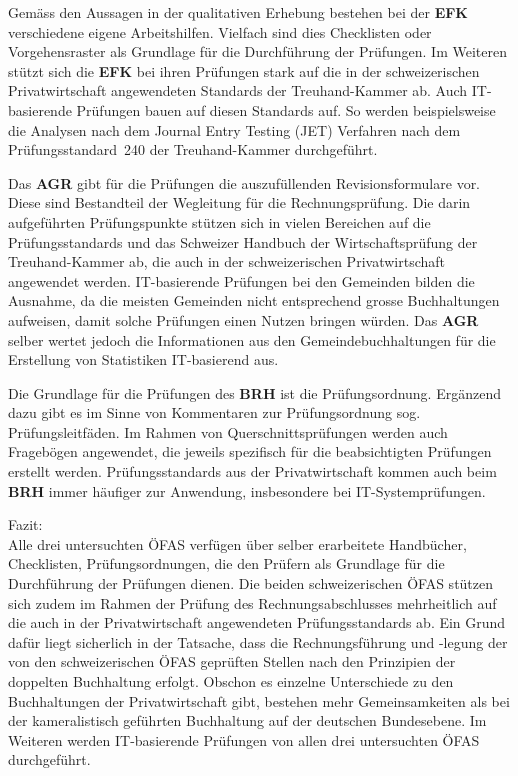 \documentclass[10pt]{article}
\begin{document}
Gemäss den Aussagen in der qualitativen Erhebung bestehen bei der \textbf{EFK} verschiedene eigene Arbeitshilfen. Vielfach sind dies Checklisten oder Vorgehensraster als Grundlage für die Durchführung der Prüfungen. Im Weiteren stützt sich die \textbf{EFK} bei ihren Prüfungen stark auf die in der schweizerischen Privatwirtschaft angewendeten Standards der Treuhand-Kammer ab. Auch IT-basierende Prüfungen bauen auf diesen Standards auf. So werden beispielsweise die Analysen nach dem Journal Entry Testing (JET) Verfahren nach dem Prüfungsstandard~240 der Treuhand-Kammer durchgeführt.

Das \textbf{AGR} gibt für die Prüfungen die auszufüllenden Revisionsformulare vor. Diese sind Bestandteil der Wegleitung für die Rechnungsprüfung. Die darin aufgeführten Prüfungspunkte stützen sich in vielen Bereichen auf die Prüfungsstandards und das Schweizer Handbuch der Wirtschaftsprüfung der Treuhand-Kammer ab, die auch in der schweizerischen Privatwirtschaft angewendet werden. IT-basierende Prüfungen bei den Gemeinden bilden die Ausnahme, da die meisten Gemeinden nicht entsprechend grosse Buchhaltungen aufweisen, damit solche Prüfungen einen Nutzen bringen würden. Das \textbf{AGR} selber wertet jedoch die Informationen aus den Gemeindebuchhaltungen für die Erstellung von Statistiken IT-basierend aus.

Die Grundlage für die Prüfungen des \textbf{BRH} ist die Prüfungsordnung. Ergänzend dazu gibt es im Sinne von Kommentaren zur Prüfungsordnung sog. Prüfungsleitfäden. Im Rahmen von Querschnittsprüfungen werden auch Fragebögen angewendet, die jeweils spezifisch für die beabsichtigten Prüfungen erstellt werden. Prüfungsstandards aus der Privatwirtschaft kommen auch beim \textbf{BRH} immer häufiger zur Anwendung, insbesondere bei IT-Systemprüfungen.

Fazit:\\
Alle drei untersuchten ÖFAS verfügen über selber erarbeitete Handbücher, Checklisten, Prüfungsordnungen, die den Prüfern als Grundlage für die Durchführung der Prüfungen dienen. Die beiden schweizerischen ÖFAS stützen sich zudem im Rahmen der Prüfung des Rechnungsabschlusses mehrheitlich auf die auch in der Privatwirtschaft angewendeten Prüfungsstandards ab. Ein Grund dafür liegt sicherlich in der Tatsache, dass die Rechnungsführung und -legung der von den schweizerischen ÖFAS geprüften Stellen nach den Prinzipien der doppelten Buchhaltung erfolgt. Obschon es einzelne Unterschiede zu den Buchhaltungen der Privatwirtschaft gibt, bestehen mehr Gemeinsamkeiten als bei der kameralistisch geführten Buchhaltung auf der deutschen Bundesebene. Im Weiteren werden IT-basierende Prüfungen von allen drei untersuchten ÖFAS durchgeführt.
\end{document}
